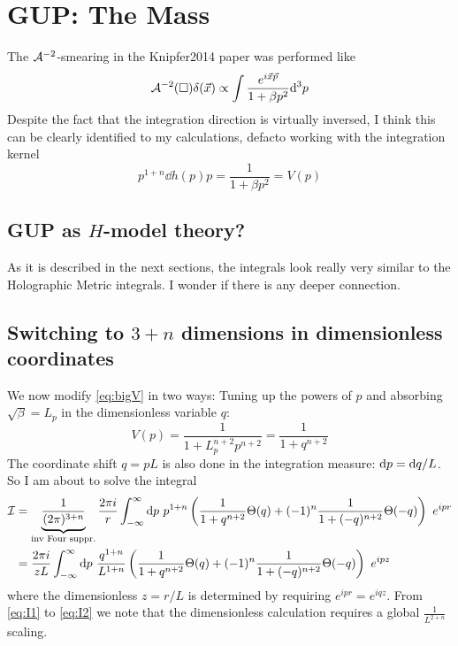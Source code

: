 \documentclass[10pt,a4paper, fleqn]{article}
\begin{document}
\section{GUP: The Mass}
The ${\cal A}^{-2}$-smearing in the Knipfer2014 paper was performed like
\begin{equation}
{\cal A}^{-2}(\square) \delta(\vec x) \propto
\int \frac{e^{i\vec x \vec p}}{1 + \beta p^2} \mathrm{d}^3 p
\label{eq:bigV}
\end{equation}
%
Despite the fact that the integration direction is virtually inversed, I think this can be clearly identified to my calculations, defacto working with the integration kernel
%
\begin{equation}
p^{1+n} \dd{h(p)}{p} = \frac 1{1+\beta p^2} = V(p)
\end{equation}

\subsection{GUP as $H$-model theory?}
As it is described in the next sections, the integrals look really very similar to the Holographic Metric integrals. I wonder if there is any deeper connection.

\subsection{Switching to $3+n$ dimensions in dimensionless coordinates}
We now modify \eqref{eq:bigV} in two ways: Tuning up the powers of $p$ and absorbing $\sqrt{\beta}=L_p$ in the dimensionless variable $q$:
\begin{equation}
V(p) = \frac{1}{1+L_p^{n+2} p^{n+2}} = \frac 1{1 + q^{n+2}}
\label{eq:Vn}
\end{equation}
The coordinate shift $q=pL$ is also done in the integration measure: $\mathrm{d} p = \mathrm{d} q / L$. So I am about to solve the integral
\begin{subequations}
\begin{align}
\label{eq:I1}
{\cal I} &=
\underbrace{\frac{1}{(2\pi)^{3+n}}}_{\text{inv Four suppr.}}
 \frac{2\pi i}r \int_{-\infty}^\infty
\mathrm{d} p~
p^{1+n}
\left(
\frac{1}{1 + q^{n+2}} \Theta(q)
+ (-1)^n
\frac{1}{1 + (-q)^{n+2}} \Theta(-q)
\right)
~e^{ipr} \\
&=  \frac{2\pi i }{zL} \int_{-\infty}^\infty
\mathrm{d} p~
\frac{q^{1+n}}{L^{1+n}}
\left(
\frac{1}{1 + q^{n+2}} \Theta(q)
+ (-1)^n
\frac{1}{1 + (-q)^{n+2}} \Theta(-q)
\right)
~e^{ipz}
\label{eq:I2}
\end{align}
\end{subequations}
where the dimensionless $z=r/L$ is determined by requiring $e^{ipr} = e^{iqz}$. From \eqref{eq:I1} to \eqref{eq:I2} we note that the dimensionless calculation requires a global $\frac 1{L^{2+n}}$ scaling.
\end{document}
